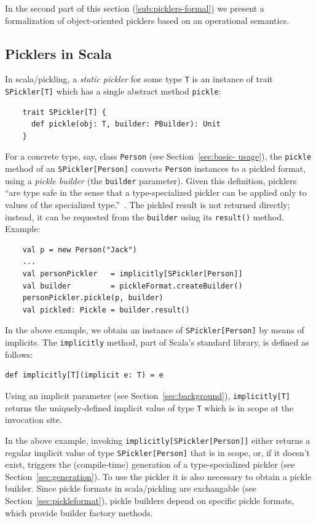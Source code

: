 \documentclass[preprint,10pt]{sigplanconf}
\theoremstyle{definition}
\theoremstyle{definition}
\begin{document}
In the second part of this section (\ref{sub:picklers-formal}) we present a
formalization of object-oriented picklers based on an operational semantics.

\subsection{Picklers in Scala}\label{sub:picklers-scala}

In scala/pickling, a {\em static pickler} for some type \verb|T| is an
instance of trait \verb|SPickler[T]| which has a single abstract method
\verb|pickle|:

\begin{lstlisting}
    trait SPickler[T] {
      def pickle(obj: T, builder: PBuilder): Unit
    }
\end{lstlisting}
\noindent
For a concrete type, say, class \verb|Person| (see Section~\ref{sec:basic-
usage}), the \verb|pickle| method of an \verb|SPickler[Person]| converts
\verb|Person| instances to a pickled format, using a {\em pickle builder} (the
\verb|builder| parameter). Given this definition, picklers ``are type safe in
the sense that a type-specialized pickler can be applied only to values of the
specialized type.''~\cite{Elsman2005}. The pickled result is not returned
directly; instead, it can be requested from the \verb|builder| using its
\verb|result()| method. Example:

\begin{lstlisting}
    val p = new Person("Jack")
    ...
    val personPickler   = implicitly[SPickler[Person]]
    val builder         = pickleFormat.createBuilder()
    personPickler.pickle(p, builder)
    val pickled: Pickle = builder.result()
\end{lstlisting}
\noindent
In the above example, we obtain an instance of \verb|SPickler[Person]| by
means of implicits. The \verb|implicitly| method, part of Scala's standard
library, is defined as follows:

\begin{lstlisting}
def implicitly[T](implicit e: T) = e
\end{lstlisting}
\noindent
Using an implicit parameter (see Section~\ref{sec:background}),
\verb|implicitly[T]| returns the uniquely-defined implicit value of type
\verb|T| which is in scope at the invocation site.

In the above example, invoking \verb|implicitly[SPickler[Person]]| either
returns a regular implicit value of type \verb|SPickler[Person]| that is in
scope, or, if it doesn't exist, triggers the (compile-time) generation of a
type-specialized pickler (see Section~\ref{sec:generation}). To use the
pickler it is also necessary to obtain a pickle builder. Since pickle formats
in scala/pickling are exchangable (see Section~\ref{sec:pickleformat}), pickle
builders depend on specific pickle formats, which provide builder factory
methods.
\end{document}
